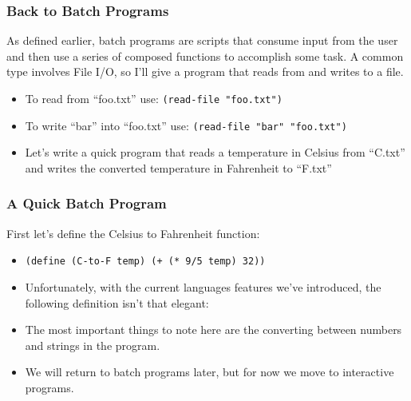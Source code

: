 \documentclass{beamer}
\begin{document}
\begin{frame}
  \frametitle{Back to Batch Programs}
  As defined earlier, batch programs are scripts that consume input from the
  user and then use a series of composed functions to accomplish some task.
  A common type involves File I/O, so I'll give a program that reads from and
  writes to a file.
  \begin{itemize}
  \item<2-> To read from ``foo.txt'' use: \texttt{(read-file "foo.txt")}
  \item<3-> To write ``bar'' into ``foo.txt'' use: \texttt{(read-file "bar" "foo.txt")}
  \item<4-> Let's write a quick program that reads a temperature in Celsius
    from ``C.txt'' and writes the converted temperature in Fahrenheit to ``F.txt''
  \end{itemize}  
\end{frame}


\begin{frame}
  \frametitle{A Quick Batch Program}
  First let's define the Celsius to Fahrenheit function:
  \begin{itemize}
  \item<2-> \texttt{(define (C-to-F temp) (+ (* 9/5 temp) 32))}
  \item<3-> Unfortunately, with the current languages features we've introduced,
    the following definition isn't that elegant: \convert
  \item<4-> The most important things to note here are the converting between
    numbers and strings in the program.
  \item<5-> We will return to batch programs later, but for now we move to interactive programs.
  \end{itemize}
\end{frame}
\end{document}
